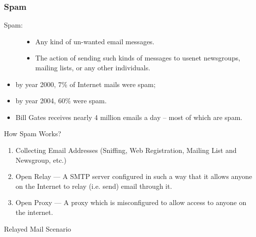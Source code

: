 \subsubsection{Spam}

\begin{frame}{}
  \begin{description}
  \item[Spam:]
    \begin{itemize}
    \item Any kind of un-wanted email messages.
    \item The action of sending such kinds of messages to usenet newsgroups, mailing
      lists, or any other individuals.
    \end{itemize}
  \end{description}
  \begin{itemize}
  \item by year 2000, 7\% of Internet mails were spam;
  \item by year 2004, 60\% were spam.
  \item Bill Gates receives nearly 4 million emails a day -- most of which are spam.
  \end{itemize}
\end{frame}

\begin{frame}{How Spam Works?}
  \begin{enumerate}
  \item Collecting Email Addresses (Sniffing, Web Registration, Mailing List and
    Newsgroup, etc.)
  \item Open Relay --- A SMTP server configured in such a way that it allows anyone on
    the Internet to relay (i.e. send) email through it.
  \item Open Proxy --- A proxy which is misconfigured to allow access to anyone on the
    internet.
  \end{enumerate}
\end{frame}

\begin{frame}
  \begin{iblock}{Relayed Mail Scenario}
    \begin{center}
    \end{center}
    \label{fig:relay}
  \end{iblock}
\end{frame}

